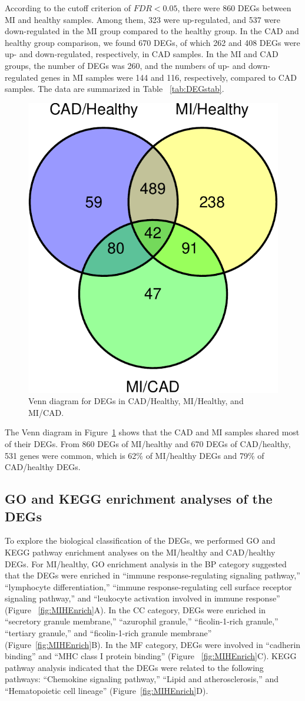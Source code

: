 \documentclass[sn-mathphys,Numbered]{sn-jnl}%
\theoremstyle{thmstyleone}%
\theoremstyle{thmstyletwo}%
\theoremstyle{thmstylethree}%
\begin{document}
According to the cutoff criterion of $FDR < 0.05$, there were 860 DEGs
between MI and healthy samples. Among them, 323 were up-regulated, and
537 were down-regulated in the MI group compared to the healthy group.
In the CAD and healthy group comparison, we found 670 DEGs, of which 262
and 408 DEGs were up- and down-regulated, respectively, in CAD samples.
In the MI and CAD groups, the number of DEGs was 260, and the numbers of
up- and down-regulated genes in MI samples were 144 and 116,
respectively, compared to CAD samples. The data are summarized in Table
~\ref{tab:DEGstab}.

\begin{figure}
\centering 
\includegraphics[width=0.45\linewidth]{venn-1}
\caption{Venn diagram for DEGs in CAD/Healthy, MI/Healthy, and MI/CAD.}\label{fig:venn}
\end{figure}

The Venn diagram in Figure~\ref{fig:venn} shows that the CAD and MI
samples shared most of their DEGs. From 860 DEGs of MI/healthy and 670
DEGs of CAD/healthy, 531 genes were common, which is 62\% of MI/healthy
DEGs and 79\% of CAD/healthy DEGs.

\subsection{GO and KEGG enrichment analyses of the
DEGs}\label{go-and-kegg-enrichment-analyses-of-the-degs}

To explore the biological classification of the DEGs, we performed GO
and KEGG pathway enrichment analyses on the MI/healthy and CAD/healthy
DEGs. For MI/healthy, GO enrichment analysis in the BP category
suggested that the DEGs were enriched in ``immune response-regulating
signaling pathway,'' ``lymphocyte differentiation,'' ``immune
response-regulating cell surface receptor signaling pathway,'' and
``leukocyte activation involved in immune response'' (Figure
~\ref{fig:MIHEnrich}A). In the CC category, DEGs were enriched in
``secretory granule membrane,'' ``azurophil granule,'' ``ficolin-1-rich
granule,'' ``tertiary granule,'' and ``ficolin-1-rich granule membrane''
(Figure~\ref{fig:MIHEnrich}B). In the MF category, DEGs were involved in
``cadherin binding'' and ``MHC class I protein binding'' (Figure
~\ref{fig:MIHEnrich}C). KEGG pathway analysis indicated that the DEGs
were related to the following pathways: ``Chemokine signaling pathway,''
``Lipid and atherosclerosis,'' and ``Hematopoietic cell lineage''
(Figure~\ref{fig:MIHEnrich}D).
\end{document}
